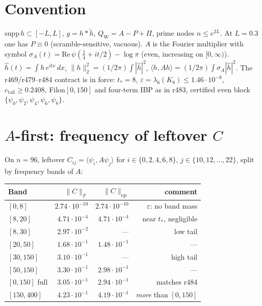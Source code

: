 \documentclass[11pt]{article}
\theoremstyle{remark}
\newcommand{\QW}{Q_{\mathrm W}}
\begin{document}
\section{Convention}

$\mathrm{supp}\,h\subset[-L,L]$, $g=h*\widetilde h$,
$\QW=A-P+\Pi$, prime nodes $n\le e^{2L}$.
At $L=0.3$ one has $P\equiv0$ (scramble-sensitive,
vacuous).
$A$ is the Fourier multiplier with symbol
$\sigma_A(t)=\mathrm{Re}\,\psi(\tfrac14+it/2)-\log\pi$
(even, increasing on $[0,\infty)$).
$\hat h(t)=\int h\,e^{itx}\,dx$,
$\|h\|_2^2=(1/2\pi)\int|\hat h|^2$,
$\langle h,Ah\rangle=(1/2\pi)\int\sigma_A|\hat h|^2$.
The r469/r479--r484 contract is in force:
$t_*=8$, $\varepsilon=\lambda_6(K_8)\le1.46\cdot10^{-8}$,
$c_{\mathrm{tail}}\ge0.2408$,
Filon$[0,150]$ and four-term IBP as in r483,
certified even block $\{\psi_0,\psi_2,\psi_4,\psi_6,\psi_8\}$.

\section{$A$-first: frequency of leftover $C$}

On $n=96$, leftover
$C_{ij}=\langle\psi_i,A\psi_j\rangle$ for
$i\in\{0,2,4,6,8\}$, $j\in\{10,12,\dots,22\}$,
split by frequency bands of $A$:

\begin{center}
\small
\begin{tabular}{@{}lrrr@{}}
\toprule
Band & $\|C\|_F$ & $\|C\|_{\mathrm{op}}$ & comment \\
\midrule
$[0,8]$ & $2.74\cdot10^{-10}$ & $2.74\cdot10^{-10}$
  & $\varepsilon$: no band mass \\
$[8,20]$ & $4.71\cdot10^{-4}$ & $4.71\cdot10^{-4}$
  & near $t_*$, negligible \\
$[8,30]$ & $2.97\cdot10^{-2}$ & --- & low tail \\
$[20,50]$ & $1.68\cdot10^{-1}$ & $1.48\cdot10^{-1}$ & --- \\
$[30,150]$ & $3.10\cdot10^{-1}$ & --- & high tail \\
$[50,150]$ & $3.30\cdot10^{-1}$ & $2.98\cdot10^{-1}$ & --- \\
$[0,150]$ full & $3.05\cdot10^{-1}$ & $2.94\cdot10^{-1}$
  & matches r484 \\
$[150,400]$ & $4.23\cdot10^{-1}$ & $4.19\cdot10^{-1}$
  & \emph{more} than $[0,150]$ \\
\bottomrule
\end{tabular}
\end{center}
\end{document}
